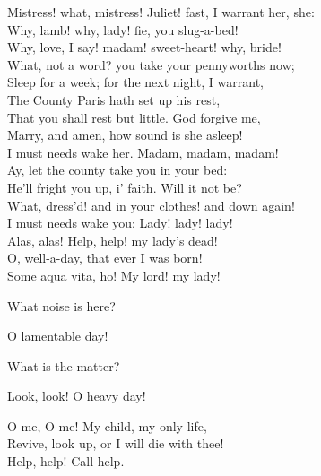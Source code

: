  
\begin{speech}
Mistress! what, mistress! Juliet! fast, I warrant her, she:
\\
Why, lamb! why, lady! fie, you slug-a-bed! \\
Why, love, I say! madam! sweet-heart! why, bride! \\
What, not a word? you take your pennyworths now; \\
Sleep for a week; for the next night, I warrant, \\
The County Paris hath set up his rest, \\
That you shall rest but little. God forgive me, \\
Marry, and amen, how sound is she asleep! \\
I must needs wake her.   Madam, madam, madam! \\
Ay, let the county take you in your bed: \\
He'll fright you up, i' faith. Will it not be? 
\\
What, dress'd! and in your clothes! and down again! \\
I must needs wake you:   Lady! lady! lady! \\
Alas, alas!   Help, help! my lady's dead! \\
O, well-a-day, that ever I was born! \\
Some aqua vita, ho!   My lord! my lady! 
\\
\end{speech}
\begin{speech}
What noise is here? \\
\end{speech}
\begin{speech}
O lamentable day! \\
\end{speech}
\begin{speech}
What is the matter? \\
\end{speech}
\begin{speech}
Look, look! O heavy day! \\
\end{speech}
\begin{speech}
O me, O me! My child, my only life, \\
Revive, look up, or I will die with thee! \\
Help, help! Call help.  \\
\end{speech}
